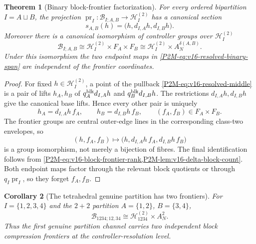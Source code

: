 \documentclass[11pt]{article}
\newtheorem{theorem}{Theorem}[section]
\newtheorem{corollary}[theorem]{Corollary}
\theoremstyle{remark}
\begin{document}
\begin{theorem}[Binary block-frontier factorization]
\label{P2M-thm:v16-binary-frontier-factorization}
For every ordered bipartition $I=A\sqcup B$, the projection
$\operatorname{pr}_I:\mathcal B_{I;A,B}\to\mathcal H_I^{(2)}$ has a canonical
section
\begin{equation}
 s_{A,B}(h)=\bigl(h,d_{I,A}h,d_{I,B}h\bigr).
\end{equation}
Moreover there is a canonical isomorphism of controller groups over
$\mathcal H_I^{(2)}$
\begin{equation}
 \boxed{
 \mathcal B_{I;A,B}
 \cong
 \mathcal H_I^{(2)}\times F_A\times F_B
 \cong
 \mathcal H_I^{(2)}\times A_N^{\delta(A,B)}.}
\end{equation}
Under this isomorphism the two endpoint maps in
\eqref{P2M-eq:v16-resolved-binary-span} are independent of the frontier
coordinates.
\end{theorem}

\begin{proof}
For fixed $h\in\mathcal H_I^{(2)}$, a point of the pullback
\eqref{P2M-eq:v16-resolved-middle} is a pair of lifts $h_A,h_B$ of
$q_A^{\rm blk}d_{I,A}h$ and $q_B^{\rm blk}d_{I,B}h$.  The restrictions
$d_{I,A}h,d_{I,B}h$ give the canonical base lifts.  Hence every other pair is
uniquely
\[
 h_A=d_{I,A}h\,f_A,
 \qquad
 h_B=d_{I,B}h\,f_B,
 \qquad
 (f_A,f_B)\in F_A\times F_B.
\]
The frontier groups are central outer-edge lines in the corresponding
class-two envelopes, so
\[
 (h,f_A,f_B)\longmapsto
 \bigl(h,d_{I,A}h\,f_A,d_{I,B}h\,f_B\bigr)
\]
is a group isomorphism, not merely a bijection of fibres.  The final
identification follows from \cref{P2M-eq:v16-block-frontier-rank,P2M-lem:v16-delta-block-count}.
Both endpoint maps factor through the relevant block quotients or through
$q_I\operatorname{pr}_I$, so they forget $f_A,f_B$.
\end{proof}

\begin{corollary}[The tetrahedral genuine partition has two frontiers]
\label{P2M-cor:v16-two-two-frontier}
For $I=\{1,2,3,4\}$ and the $2+2$ partition
$A=\{1,2\}$, $B=\{3,4\}$,
\begin{equation}
 \boxed{
 \mathcal B_{1234;12,34}
 \cong
 \mathcal H_{1234}^{(2)}\times A_N^2.}
\end{equation}
Thus the first genuine partition channel carries two independent block
compression frontiers at the controller-resolution level.
\end{corollary}
\end{document}
